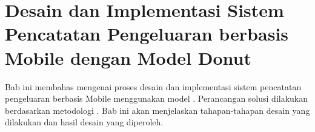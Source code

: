 \chapter{Desain dan Implementasi Sistem Pencatatan Pengeluaran berbasis Mobile dengan Model Donut}
\label{chapter:desain-implementasi}
Bab ini membahas mengenai proses desain dan implementasi sistem pencatatan pengeluaran berbasis Mobile menggunakan model \donut. Perancangan solusi dilakukan berdasarkan metodologi \dsrm. Bab ini akan menjelaskan tahapan-tahapan desain yang dilakukan dan hasil desain yang diperoleh.



\newpage



